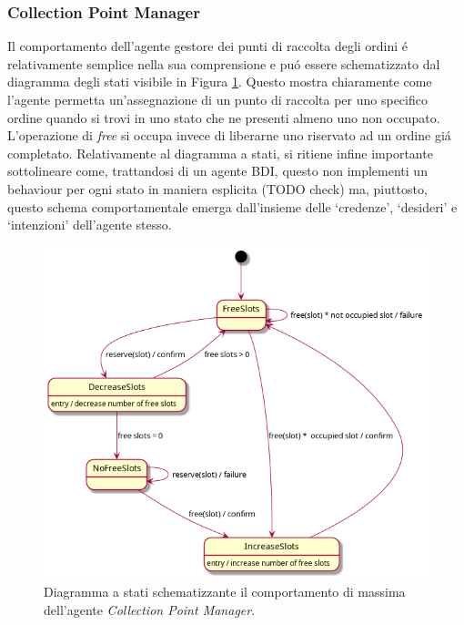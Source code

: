 \subsubsection{Collection Point Manager}
Il comportamento dell'agente gestore dei punti di raccolta degli ordini \'e relativamente semplice nella sua comprensione e pu\'o essere schematizzato dal diagramma degli stati visibile in Figura \ref{fig:state-diagram-cpm}. Questo mostra chiaramente come l'agente permetta un'assegnazione di un punto di raccolta per uno specifico ordine quando si trovi in uno stato che ne presenti almeno uno non occupato. L'operazione di \textit{free} si occupa invece di liberarne uno riservato ad un ordine gi\'a completato.%
\parag
Relativamente al diagramma a stati, si ritiene infine importante sottolineare come, trattandosi di un agente BDI, questo non implementi un behaviour per ogni stato in maniera esplicita (TODO check) ma, piuttosto, questo schema comportamentale emerga dall'insieme delle `credenze', `desideri' e `intenzioni' dell'agente stesso.
\begin{figure}[!ht]\centering
    \includegraphics[width=\textwidth]{section/design/figure/collection_point_manager/state_diagram.png}
    \caption{Diagramma a stati schematizzante il comportamento di massima dell'agente \textit{Collection Point Manager}.}
    \label{fig:state-diagram-cpm}
\end{figure}

